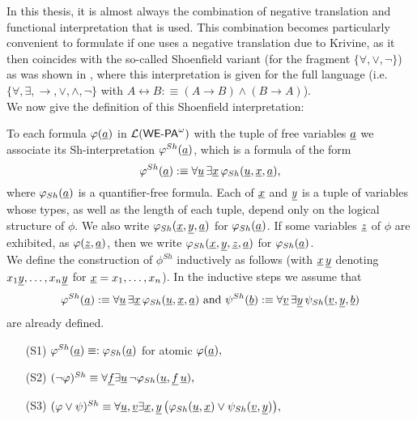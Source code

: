 In this thesis, it is almost always the combination of negative 
translation and functional interpretation that is used. This combination becomes 
particularly convenient to formulate if one uses a negative translation due 
to Krivine, as it then coincides with the so-called Shoenfield variant 
\cite{Shoenfield67} (for the fragment $\{ \forall, \vee,\neg\}$) as 
was shown in \cite{streicherkohlenbach07}, where this interpretation is 
given for the full language (i.e. $\{ \forall, \exists, \rightarrow,\vee,
\wedge,\neg \}$ with $A\leftrightarrow B:\equiv 
(A\to B) \wedge (B\to A)$). 
\\[1mm]
We now give the definition of this Shoenfield interpretation:   
\begin{dfn} \label{d:FI}
To each formula $\varphi(\underline{a})$ in ${\mathcal L}({\textsf{\upshape WE-PA}}^{\omega})$ with the tuple of
free variables $\underline{a}$ we associate its {Sh-interpretation}
$\varphi^{Sh}(\underline{a})$, which is a formula of the form
\[
\varphi^{Sh}(\underline{a}):\equiv\forall \underline{u}\,\exists \underline{x}\, 
\varphi_{Sh}(\underline{u},\underline{x}, \underline{a})
\text{,}
\]
where $\varphi_{Sh}(\underline{a})$ is a quantifier-free formula.
Each of $\underline{x}$ and $\underline{y}$ is a tuple of variables whose
types, as well
as the length of each tuple, depend only on the logical structure of $\phi$. 
We also write $\varphi_{Sh}(\underline{x},\underline{y},\underline{a})$ for $\varphi_{Sh}(\underline{a})$. 
If some variables
$\underline z$ of $\phi$ are exhibited, as $\varphi(\underline z,\underline a)$, then we write
$\varphi_{Sh}(\underline x, \underline y, \underline z,\underline{a})$ for $\varphi_{Sh}(\underline{a})$.\\
We define the construction of $\phi^{Sh}$ inductively as follows 
(with $\underline{x}\,\underline{y}$ denoting $x_1\underline{y},\ldots,x_n\underline{y}$ for 
$\underline{x}=x_1,\ldots,x_n$). In the inductive steps we assume that 
\[
\phi^{Sh}(\tup{a}):\equiv\forall \tup{u}\,\exists \tup{x}\, 
\phi_{Sh}(\tup{u},\tup{x}, \tup{a}) \ 
\text{and} \ \psi^{Sh}(\tup{b}):\equiv\forall \tup{v}\,\exists \tup{y}\, 
\psi_{Sh}(\tup{v},\tup{y}, \tup{b})
\] are already defined. 
\begin{enumerate}
\item[(S1)] $\varphi^{Sh}(\underline{a}) 
\equiv:\varphi_{Sh}(\underline{a})$ for atomic 
$\varphi(\underline{a}),$
\item[(S2)] $(\neg \varphi)^{Sh} \equiv \forall \underline{f} \exists \underline{u} \, 
\neg \varphi_{Sh}(\underline{u},\underline{f}\,\underline{u}),$
\item[(S3)] $(\varphi \vee \psi)^{Sh} \equiv 
             \forall \underline{u},\underline{v} \exists \underline{x},\underline{y} \, 
\big(\varphi_{Sh}(\underline{u},\underline{x}) \vee \psi_{Sh}(\underline{v},\underline{y})\big),$

\end{enumerate}
\end{dfn}
